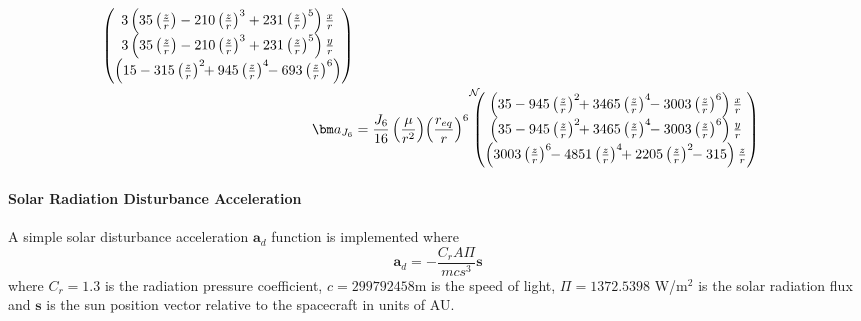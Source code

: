 \begin{align}
{\begin{pmatrix}
		3\left(35\left(\frac{z}{r}\right) - 210 
		\left(\frac{z}{r}\right)^{3} +231 \left(\frac{z}{r}\right)^{5}
		\right) \frac{x}{r} \\
		3\left(35\left(\frac{z}{r}\right) - 210 
		\left(\frac{z}{r}\right)^{3} +231 \left(\frac{z}{r}\right)^{5}
		\right) \frac{y}{r} \\
		\left(15- 315\left(\frac{z}{r}\right)^{2} \!\!+ 945 
		\left( \frac{z}{r}\right)^{4}\!\! -693 \left(\frac{z}{r}\right)^{6} 
		\right) 
	\end{pmatrix}}
	\label{eq:gm:aJ5}
	\\
	\bm a_{J_{6}} &=  \frac{J_{6}}{16}  
	\left(\frac{\mu}{r^{2}}\right)\!
	\left( \frac{r_{eq}}{r}\right)^{6}\!
	\leftexp{N\!\!\!}{
	\begin{pmatrix}
		\left(35 - 945 \left(\frac{z}{r}\right)^{2} \!\!
		+ 3465 \left(\frac{z}{r}\right)^{4} \!\!
		- 3003 \left(\frac{z}{r}\right)^{6} 
		\right) \frac{x}{r} \\
		\left(35 - 945 \left(\frac{z}{r}\right)^{2} \!\!
		+ 3465 \left(\frac{z}{r}\right)^{4} \!\!
		- 3003 \left(\frac{z}{r}\right)^{6}  
		\right) \frac{y}{r} \\
		\left( 3003 \left(\frac{z}{r}\right)^{6} \!\!
		-4851 \left(\frac{z}{r}\right)^{4}\!\!
		+ 2205 \left(\frac{z}{r}\right)^{2}\!\!
		- 315
		\right) \frac{z}{r}
	\end{pmatrix}}
	\label{eq:gm:aJ6}
\end{align}

\paragraph{Solar Radiation Disturbance Acceleration}
A simple solar disturbance acceleration $\bm a_{d}$ function is implemented where
\begin{equation}
	\bm a_{d} = - \frac{C_{r} A \Pi}{m c s^{3}} \bm s
\end{equation}
where $C_{r} = 1.3$ is the radiation pressure coefficient,  $c = 299792458$m is the speed of light, $\Pi = 1372.5398$ W/m$^{2}$ is the solar radiation flux and $\bm s$ is the sun position vector relative to the spacecraft in units of AU.  




